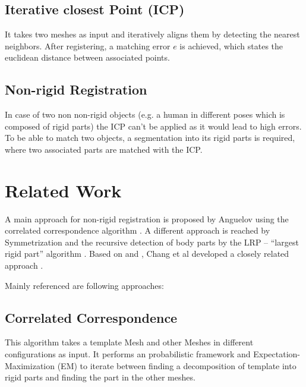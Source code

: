 \documentclass[notitlepage,english]{hgbreport}
\begin{document}
\subsection{Iterative closest Point (ICP)}

It takes two meshes as input and iteratively aligns them by detecting the nearest neighbors. After registering, a matching error $e$ is achieved, which states the euclidean distance between associated points.

\subsection{Non-rigid Registration}

In case of two non non-rigid objects (e.g. a human in different poses which is composed of rigid parts) the ICP can't be applied as it would lead to high errors. To be able to match two objects, a segmentation into its rigid parts is required, where two associated parts are matched with the ICP.


\section{Related Work}
\label{cha:relatedWork}

A main approach for non-rigid registration is proposed by Anguelov \cite{Anguelov04} using the correlated correspondence algorithm \cite{CorrelatedCorrespondance}. A different approach is reached by Symmetrization \cite{Mitra07} and the recursive detection of body parts by the LRP -- ``largest rigid part'' algorithm \cite {guo2016correspondence}. Based on \cite{Anguelov04} and \cite{Mitra07}, Chang et al developed a closely related approach \cite{chang08articulated} \cite{chang09range}.

Mainly referenced are following approaches:

\subsection{Correlated Correspondence}

This algorithm takes a template Mesh and other Meshes in different configurations as input. It performs an probabilistic framework and Expectation-Maximization (EM) to iterate between finding a decomposition of template into rigid parts and finding
the part in the other meshes.
\end{document}

